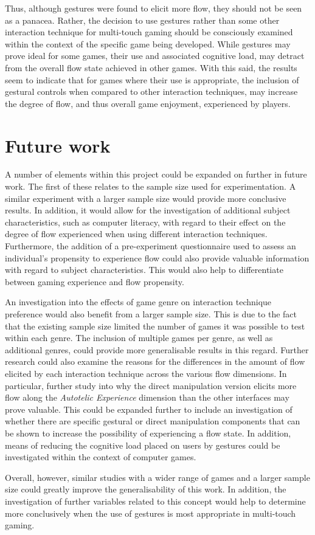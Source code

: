 Thus, although gestures were found to elicit more flow, they should not be seen as a panacea. Rather, the decision to use gestures rather than some other interaction technique for multi-touch gaming should be consciously examined within the context of the specific game being developed. While gestures may prove ideal for some games, their use and associated cognitive load, may detract from the overall flow state achieved in other games. With this said, the results seem to indicate that for games where their use is appropriate, the inclusion of gestural controls when compared to other interaction techniques, may increase the degree of flow, and thus overall game enjoyment, experienced by players.

\section{Future work}
A number of elements within this project could be expanded on further in future work. The first of these relates to the sample size used for experimentation. A similar experiment with a larger sample size would provide more conclusive results. In addition, it would allow for the investigation of additional subject characteristics, such as computer literacy, with regard to their effect on the degree of flow experienced when using different interaction techniques. Furthermore, the addition of a pre-experiment questionnaire used to assess an individual's propensity to experience flow could also provide valuable information with regard to subject characteristics. This would also help to differentiate between gaming experience and flow propensity.

An investigation into the effects of game genre on interaction technique preference would also benefit from a larger sample size. This is due to the fact that the existing sample size limited the number of games it was possible to test within each genre. The inclusion of multiple games per genre, as well as additional genres, could provide more generalisable results in this regard. Further research could also examine the reasons for the differences in the amount of flow elicited by each interaction technique across the various flow dimensions. In particular, further study into why the direct manipulation version elicits more flow along the \emph{Autotelic Experience} dimension than the other interfaces may prove valuable. This could be expanded further to include an investigation of whether there are specific gestural or direct manipulation components that can be shown to increase the possibility of experiencing a flow state. In addition, means of reducing the cognitive load placed on users by gestures could be investigated within the context of computer games.

Overall, however, similar studies with a wider range of games and a larger sample size could greatly improve the generalisability of this work. In addition, the investigation of further variables related to this concept would help to determine more conclusively when the use of gestures is most appropriate in multi-touch gaming.

